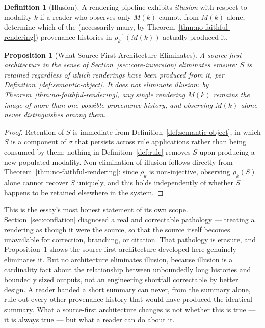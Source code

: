\documentclass[11pt]{article}
\newtheorem{proposition}[theorem]{Proposition}
\theoremstyle{definition}
\newtheorem{definition}[theorem]{Definition}
\begin{document}
\begin{definition}[Illusion]
\label{def:illusion}
A rendering pipeline exhibits \emph{illusion} with respect to modality $k$ if a reader who observes only $M(k)$ cannot, from $M(k)$ alone, determine which of the (necessarily many, by Theorem~\ref{thm:no-faithful-rendering}) provenance histories in $\rho_k^{-1}(M(k))$ actually produced it.
\end{definition}

\begin{proposition}[What Source-First Architecture Eliminates]
\label{prop:eliminates}
A source-first architecture in the sense of Section~\ref{sec:core-inversion} eliminates erasure: $S$ is retained regardless of which renderings have been produced from it, per Definition~\ref{def:semantic-object}. It does not eliminate illusion: by Theorem~\ref{thm:no-faithful-rendering}, any single rendering $M(k)$ remains the image of more than one possible provenance history, and observing $M(k)$ alone never distinguishes among them.
\end{proposition}

\begin{proof}
Retention of $S$ is immediate from Definition~\ref{def:semantic-object}, in which $S$ is a component of $\sigma$ that persists across rule applications rather than being consumed by them; nothing in Definition~\ref{def:rule} removes $S$ upon producing a new populated modality. Non-elimination of illusion follows directly from Theorem~\ref{thm:no-faithful-rendering}: since $\rho_k$ is non-injective, observing $\rho_k(S)$ alone cannot recover $S$ uniquely, and this holds independently of whether $S$ happens to be retained elsewhere in the system.
\end{proof}

This is the essay's most honest statement of its own scope. Section~\ref{sec:conflation} diagnosed a real and correctable pathology --- treating a rendering as though it were the source, so that the source itself becomes unavailable for correction, branching, or citation. That pathology is erasure, and Proposition~\ref{prop:eliminates} shows the source-first architecture developed here genuinely eliminates it. But no architecture eliminates illusion, because illusion is a cardinality fact about the relationship between unboundedly long histories and boundedly sized outputs, not an engineering shortfall correctable by better design. A reader handed a short summary can never, from the summary alone, rule out every other provenance history that would have produced the identical summary. What a source-first architecture changes is not whether this is true --- it is always true --- but what a reader can do about it.
\end{document}

